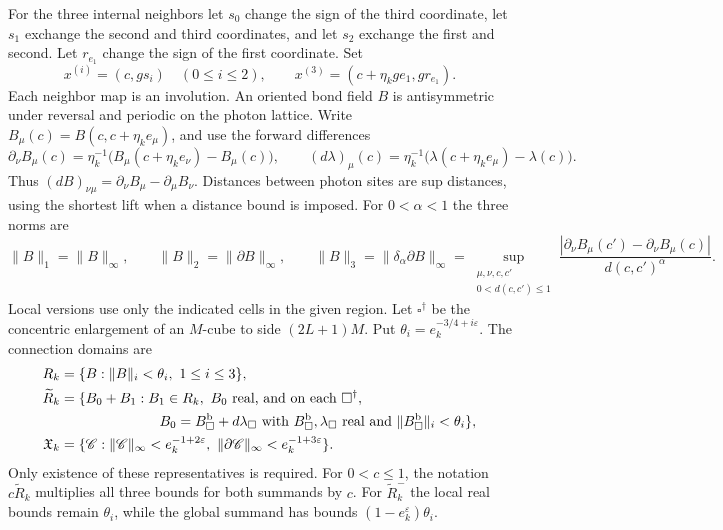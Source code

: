 For the three internal neighbors let \(s_0\) change the sign of
the third coordinate, let \(s_1\) exchange the second and third
coordinates, and let \(s_2\) exchange the first and second.
Let \(r_{e_1}\) change the sign of the first coordinate. Set
\[
 x^{(i)}=(c,gs_i)\quad(0\le i\le2),\qquad
 x^{(3)}=(c+\eta_kge_1,gr_{e_1}).
\]
Each neighbor map is an involution. An oriented bond field
\(B\) is antisymmetric under reversal and periodic on the photon
lattice. Write \(B_\mu(c)=B(c,c+\eta_ke_\mu)\), and use the
forward differences
\[
 \partial_\nu B_\mu(c)=
       \eta_k^{-1}\bigl(B_\mu(c+\eta_ke_\nu)-B_\mu(c)\bigr),
 \qquad
 (d\lambda)_\mu(c)=
       \eta_k^{-1}\bigl(\lambda(c+\eta_ke_\mu)-\lambda(c)\bigr).
\]
Thus \((dB)_{\nu\mu}=\partial_\nu B_\mu-\partial_\mu B_\nu\).
Distances between photon sites are sup distances, using the
shortest lift when a distance bound is imposed. For \(0<\alpha<1\)
the three norms are
\[
 \|B\|_1=\|B\|_\infty,\qquad
 \|B\|_2=\|\partial B\|_\infty,\qquad
 \|B\|_3=\|\delta_\alpha\partial B\|_\infty
 =\sup_{\substack{\mu,\nu,c,c'\\0<d(c,c')\le1}}
 \frac{|\partial_\nu B_\mu(c')-\partial_\nu B_\mu(c)|}
      {d(c,c')^\alpha}.
\]
Local versions use only the indicated cells in the given region.
Let \(\square^\dagger\) be the concentric enlargement of an
\(M\)-cube to side \((2L+1)M\). Put
\(\theta_i=e_k^{-3/4+i\varepsilon}\).
The connection domains are
\begin{equation}\label{eq:connection-domains}
\begin{split}
 R_k&=\{B:\|B\|_i<\theta_i,\ 1\le i\le3\},\\
 \widetilde R_k&=\{B_0+B_1:B_1\in R_k,\ B_0\text{ real, and on each }
          \square^\dagger,\\
 &\hspace{25mm} B_0=B_\square^{\mathrm b}+d\lambda_\square
   \text{ with }B_\square^{\mathrm b},\lambda_\square\text{ real and }
          \|B_\square^{\mathrm b}\|_i<\theta_i\},\\
 \mathfrak X_k&=\{\mathscr C:\|\mathscr C\|_\infty<e_k^{-1+2\varepsilon},\
                  \|\partial\mathscr C\|_\infty<e_k^{-1+3\varepsilon}\}.
\end{split}
\end{equation}
Only existence of these representatives is required.
For \(0<c\le1\), the notation \(c\widetilde R_k\) multiplies
all three bounds for both summands by \(c\).
For \(\widetilde R_k^-\) the local real bounds remain
\(\theta_i\), while the global summand has bounds
\((1-e_k^\varepsilon)\theta_i\).

